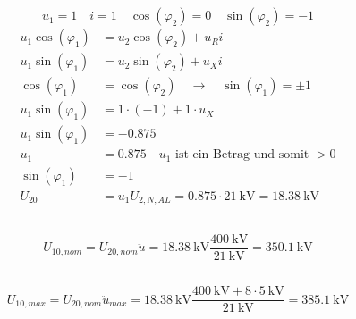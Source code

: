 \documentclass[11pt,a4paper]{scrartcl}
\newcommand{\mybr}[1]{\left(#1\right)}
\newcommand{\0}{_{\mybr{0}}}
\newcommand{\1}{_{\mybr{1}}}
\newcommand{\2}{_{\mybr{2}}}
\newcommand{\USNA}{U_{2,N,AL}}
\newcommand{\ce}{\cos\mybr{\varphi_1}}
\newcommand{\se}{\sin\mybr{\varphi_1}}
\newcommand{\cz}{\cos\mybr{\varphi_2}}
\newcommand{\sz}{\sin\mybr{\varphi_2}}
\begin{document}
\section{}
\subsection{}
\begin{equation}
u_1=1\quad i=1\quad \cz=0\quad \sz=-1
\end{equation}
\begin{align}
u_1\ce&=u_2\cz+u_R i\\
u_1\se&=u_2\sz+u_X i\\
\ce&=\cz\quad \rightarrow\quad \se = \pm 1\\
u_1\se&=1\cdot\mybr{-1}+1\cdot u_X\\
u_1\se&=\num{-0.875}\\
u_1&=\num{0.875}\quad\text{$u_1$ ist ein Betrag und somit $>0$}\\
\se&=\num{-1}\\
U_{20}&=u_1\USNA=\num{0.875}\cdot\SI{21}{\kilo\volt}=\SI{18.38}{\kilo\volt}
\end{align}

\subsection{}
\begin{equation}
U_{10,nom}=U_{20,nom}\ddot{u}=\SI{18.38}{\kilo\volt}\frac{\SI{400}{\kilo\volt}}{\SI{21}{\kilo\volt}}=\SI{350.1}{\kilo\volt}
\end{equation}

\subsection{}
\begin{equation}
U_{10,max}=U_{20,nom}\ddot{u}_{max}=\SI{18.38}{\kilo\volt}\frac{\SI{400}{\kilo\volt}+8\cdot\SI{5}{\kilo\volt}}{\SI{21}{\kilo\volt}}=\SI{385.1}{\kilo\volt}
\end{equation}

\section{}
\end{document}
